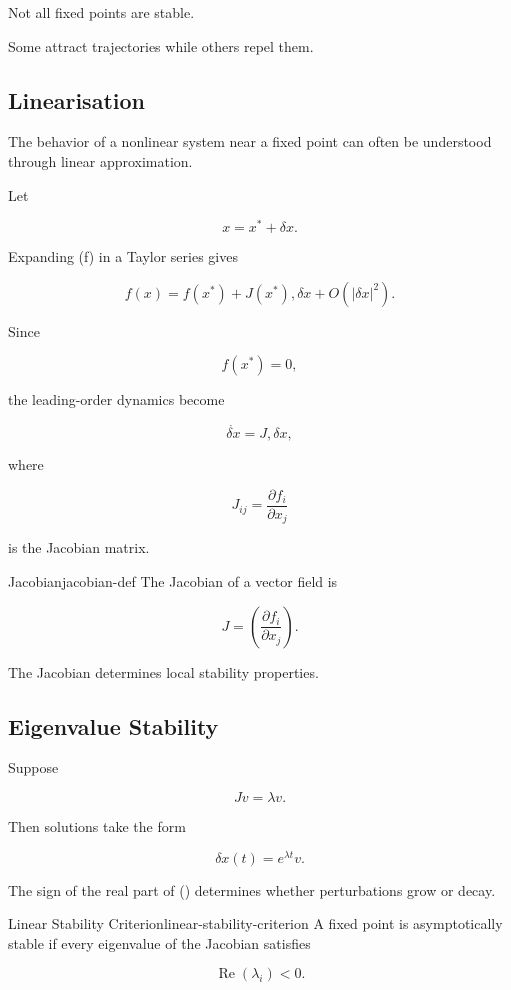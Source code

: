 \documentclass[12pt,twoside,openright]{book}
\begin{document}
Not all fixed points are stable.

Some attract trajectories while others repel them.

\subsection{Linearisation}

The behavior of a nonlinear system near a fixed point can
often be understood through linear approximation.

Let

\[
x=x^*+\delta x.
\]

Expanding (f) in a Taylor series gives

\[
f(x)
=

f(x^*)
+
J(x^*),\delta x
+
O(|\delta x|^2).
\]

Since

\[
f(x^*)=0,
\]

the leading-order dynamics become

\[
\dot{\delta x}
=

J,\delta x,
\]

where

\[
J_{ij}
=

\frac{\partial f_i}{\partial x_j}
\]

is the Jacobian matrix.

\begin{definition}{Jacobian}{jacobian-def}
The Jacobian of a vector field is

\[
J
=

\left(
\frac{\partial f_i}{\partial x_j}
\right).
\]
\end{definition}

The Jacobian determines local stability properties.

\subsection{Eigenvalue Stability}

Suppose

\[
Jv=\lambda v.
\]

Then solutions take the form

\[
\delta x(t)
=

e^{\lambda t}v.
\]

The sign of the real part of (\lambda) determines
whether perturbations grow or decay.

\begin{theorem}{Linear Stability Criterion}{linear-stability-criterion}
A fixed point is asymptotically stable if every eigenvalue
of the Jacobian satisfies

\[
\operatorname{Re}(\lambda_i)<0.
\]
\end{theorem}
\end{document}
